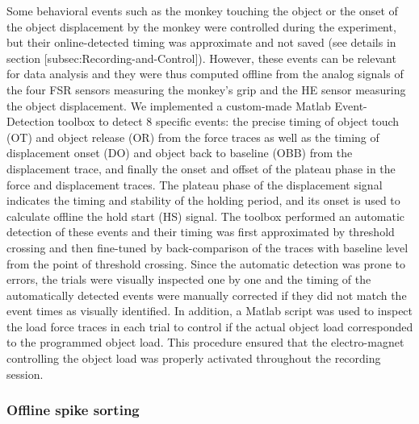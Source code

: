 {Some behavioral events such as the monkey touching the object or the onset of the object displacement by the monkey were controlled during the experiment, but their online-detected timing was approximate and not saved (see details in section [subsec:Recording-and-Control]). However, these events can be relevant for data analysis and they were thus computed offline from the analog signals of the four FSR sensors measuring the monkey's grip and the HE sensor measuring the object displacement. We implemented a custom-made Matlab Event-Detection toolbox to detect 8 specific events: the precise timing of object touch (OT) and object release (OR) from the force traces as well as the timing of displacement onset (DO) and object back to baseline (OBB) from the displacement trace, and finally the onset and offset of the plateau phase in the force and displacement traces. The plateau phase of the displacement signal indicates the timing and stability of the holding period, and its onset is used to calculate offline the hold start (HS) signal. The toolbox performed an automatic detection of these events and their timing was first approximated by threshold crossing and then fine-tuned by back-comparison of the traces with baseline level from the point of threshold crossing. Since the automatic detection was prone to errors, the trials were visually inspected one by one and the timing of the automatically detected events were manually corrected if they did not match the event times as visually identified. In addition, a Matlab script was used to inspect the load force traces in each trial to control if the actual object load corresponded to the programmed object load. This procedure ensured that the electro-magnet controlling the object load was properly activated throughout the recording session. 

\subsubsection{Offline spike sorting}

}
